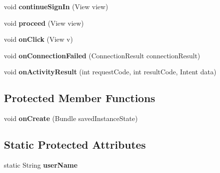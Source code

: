 {\begin{DoxyCompactItemize}
\item 
\hypertarget{classcom_1_1example_1_1sel_1_1lostfound_1_1MainActivity_af6914b0175f989ccb1c616f05a162f1a}{void {\bfseries continue\-Sign\-In} (\-View view)}\label{classcom_1_1example_1_1sel_1_1lostfound_1_1MainActivity_af6914b0175f989ccb1c616f05a162f1a}

\item 
\hypertarget{classcom_1_1example_1_1sel_1_1lostfound_1_1MainActivity_a4618c5d451d4e0c2ce4562499a583ee5}{void {\bfseries proceed} (\-View view)}\label{classcom_1_1example_1_1sel_1_1lostfound_1_1MainActivity_a4618c5d451d4e0c2ce4562499a583ee5}

\item 
\hypertarget{classcom_1_1example_1_1sel_1_1lostfound_1_1MainActivity_ac979afc8333ca7e81e7859cd383c614d}{void {\bfseries on\-Click} (\-View v)}\label{classcom_1_1example_1_1sel_1_1lostfound_1_1MainActivity_ac979afc8333ca7e81e7859cd383c614d}

\item 
\hypertarget{classcom_1_1example_1_1sel_1_1lostfound_1_1MainActivity_a15df38b4157a1f3a7c9dd7c8099e7495}{void {\bfseries on\-Connection\-Failed} (\-Connection\-Result connection\-Result)}\label{classcom_1_1example_1_1sel_1_1lostfound_1_1MainActivity_a15df38b4157a1f3a7c9dd7c8099e7495}

\item 
\hypertarget{classcom_1_1example_1_1sel_1_1lostfound_1_1MainActivity_ad934ef9a9347dc67bcaf5365213f58da}{void {\bfseries on\-Activity\-Result} (int request\-Code, int result\-Code, \-Intent data)}\label{classcom_1_1example_1_1sel_1_1lostfound_1_1MainActivity_ad934ef9a9347dc67bcaf5365213f58da}

\end{DoxyCompactItemize}
\subsection*{\-Protected \-Member \-Functions}
\begin{DoxyCompactItemize}
\item 
\hypertarget{classcom_1_1example_1_1sel_1_1lostfound_1_1MainActivity_ac0ce1d56e609a8b69d6227c6d4d59f48}{void {\bfseries on\-Create} (\-Bundle saved\-Instance\-State)}\label{classcom_1_1example_1_1sel_1_1lostfound_1_1MainActivity_ac0ce1d56e609a8b69d6227c6d4d59f48}

\end{DoxyCompactItemize}
\subsection*{\-Static \-Protected \-Attributes}
\begin{DoxyCompactItemize}
\item 
\hypertarget{classcom_1_1example_1_1sel_1_1lostfound_1_1MainActivity_a1a8d41b931cf85891f5fd3497d34a32a}{static \-String {\bfseries user\-Name}}\label{classcom_1_1example_1_1sel_1_1lostfound_1_1MainActivity_a1a8d41b931cf85891f5fd3497d34a32a}


\end{DoxyCompactItemize}}
